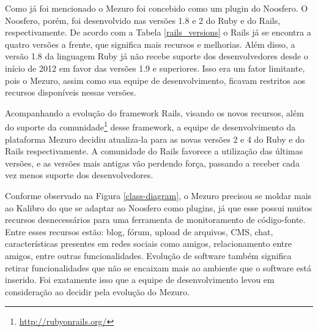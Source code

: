 
  
Como já foi mencionado o Mezuro foi concebido como um plugin do Noosfero. O Noosfero, porém, foi desenvolvido nas versões 1.8 e 2 do Ruby e do Rails, respectivamente. De acordo com a Tabela \ref{rails_versions} o Rails já se encontra a quatro versões a frente, que significa mais recursos e melhorias. Além disso, a versão 1.8 da linguagem Ruby já não recebe suporte dos desenvolvedores desde o início de 2012 em favor das versões 1.9 e superiores. Isso era um fator limitante, pois o Mezuro, assim como sua equipe de desenvolvimento, ficavam restritos aos recursos disponíveis nessas versões.

Acompanhando a evolução do framework Rails, visando os novos recursos, além do suporte da comunidade\footnote{\url{http://rubyonrails.org/}} desse framework, a equipe de desenvolvimento da plataforma Mezuro decidiu atualiza-la para as novas versões 2 e 4 do Ruby e do Rails respectivamente. A comunidade do Rails favorece a utilização das últimas versões, e as versões mais antigas vão perdendo força, passando a receber cada vez menos suporte dos desenvolvedores.

Conforme observado na Figura \ref{class-diagram}, o Mezuro precisou se moldar mais ao Kalibro do que se adaptar ao Noosfero como plugins, já que esse possui muitos recursos desnecessários para uma ferramenta de monitoramento de código-fonte. Entre esses recursos estão: blog, fórum, upload de arquivos, CMS, chat, características presentes em redes sociais como amigos, relacionamento entre amigos, entre outras funcionalidades. Evolução de software também significa retirar funcionalidades que não se encaixam mais ao ambiente que o software está inserido. Foi exatamente isso que a equipe de desenvolvimento levou em consideração ao decidir pela evolução do Mezuro.

